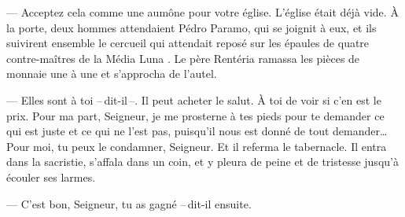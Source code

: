   --- Acceptez cela comme une aumône pour votre église.
\pend
%
\pstart
  L'église était déjà vide. À la porte, deux hommes attendaient Pédro Paramo, qui se joignit à eux, et ils suivirent ensemble le cercueil qui attendait reposé sur les épaules de quatre contre-maîtres de la Média Luna\footnotemark[1]
.
\pend
%
\pstart
  Le père Rentéria ramassa les pièces de monnaie une à une et s'approcha de l'autel.

  --- Elles sont à toi --\,dit-il\,--. Il peut acheter le salut. À toi de voir si c'en est le prix. Pour ma part, Seigneur, je me prosterne à tes pieds pour te demander ce qui est juste et ce qui ne l'est pas, puisqu'il nous est donné de tout demander\ldots Pour moi, tu peux le condamner, Seigneur.
\pend
%
\pstart
  Et il referma le tabernacle.
\pend
%
\pstart
  Il entra dans la sacristie, s'affala dans un coin, et y pleura de peine et de tristesse jusqu'à écouler ses larmes.

  --- C'est bon, Seigneur, tu as gagné --\,dit-il ensuite.
\pend
